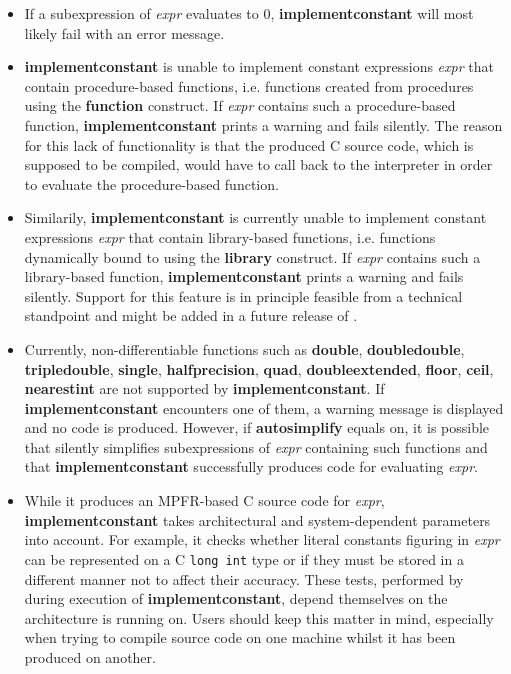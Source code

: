 \begin{itemize}
\item If a subexpression of \emph{expr} evaluates to $0$, \textbf{implementconstant} will most
   likely fail with an error message.

\item \textbf{implementconstant} is unable to implement constant expressions \emph{expr} that
   contain procedure-based functions, i.e. functions created from \sollya
   procedures using the \textbf{function} construct. If \emph{expr} contains such a
   procedure-based function, \textbf{implementconstant} prints a warning and fails
   silently. The reason for this lack of functionality is that the
   produced C source code, which is supposed to be compiled, would have
   to call back to the \sollya interpreter in order to evaluate the
   procedure-based function.

\item Similarily, \textbf{implementconstant} is currently unable to implement constant
   expressions \emph{expr} that contain library-based functions, i.e.
   functions dynamically bound to \sollya using the \textbf{library} construct.
   If \emph{expr} contains such a library-based function, \textbf{implementconstant} prints
   a warning and fails silently. Support for this feature is in principle
   feasible from a technical standpoint and might be added in a future
   release of \sollya.

\item Currently, non-differentiable functions such as \textbf{double}, \textbf{doubledouble},
   \textbf{tripledouble}, \textbf{single}, \textbf{halfprecision}, \textbf{quad}, \textbf{doubleextended}, 
   \textbf{floor}, \textbf{ceil}, \textbf{nearestint} are not supported by \textbf{implementconstant}. 
   If \textbf{implementconstant} encounters one of them, a warning message is displayed 
   and no code is produced. However, if \textbf{autosimplify} equals on, it is 
   possible that \sollya silently simplifies subexpressions of \emph{expr} 
   containing such functions and that \textbf{implementconstant} successfully produces 
   code for evaluating \emph{expr}.

\item While it produces an MPFR-based C source code for \emph{expr}, \textbf{implementconstant}
   takes architectural and system-dependent parameters into account.  For
   example, it checks whether literal constants figuring in \emph{expr} can be
   represented on a C \texttt{long int} type or if they must
   be stored in a different manner not to affect their accuracy. These
   tests, performed by \sollya during execution of \textbf{implementconstant}, depend
   themselves on the architecture \sollya is running on. Users should
   keep this matter in mind, especially when trying to compile source
   code on one machine whilst it has been produced on another.
\end{itemize}

